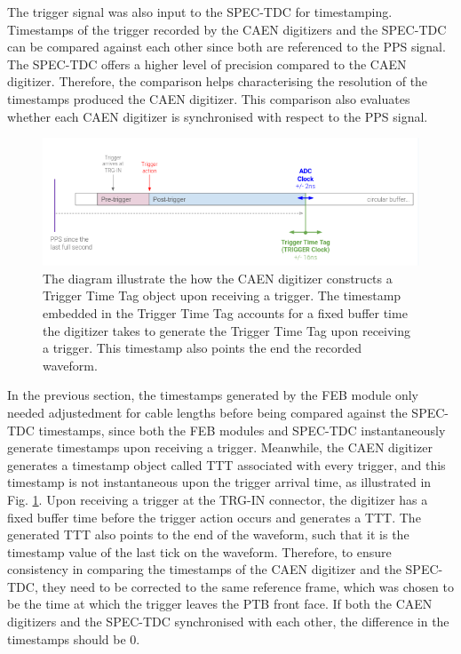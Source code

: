 The trigger signal was also input to the SPEC-TDC for timestamping.
Timestamps of the trigger recorded by the CAEN digitizers and the SPEC-TDC can be compared against each other since both are referenced to the PPS signal.
The SPEC-TDC offers a higher level of precision compared to the CAEN digitizer.
Therefore, the comparison helps characterising the resolution of the timestamps produced the CAEN digitizer. 
This comparison also evaluates whether each CAEN digitizer is synchronised with respect to the PPS signal.

\begin{figure}[htbp!] 
\centering    
\includegraphics[width=1.0\textwidth]{TTT_diagram}
\caption[TTTDiagram]{
The diagram illustrate the how the CAEN digitizer constructs a Trigger Time Tag object upon receiving a trigger.
The timestamp embedded in the Trigger Time Tag accounts for a fixed buffer time the digitizer takes to generate the Trigger Time Tag upon receiving a trigger.
This timestamp also points the end the recorded waveform.
}
\label{fig:TTTDiagram}
\end{figure}

In the previous section, the timestamps generated by the FEB module only needed adjustedment for cable lengths before being compared against the SPEC-TDC timestamps, since both the FEB modules and SPEC-TDC instantaneously generate timestamps upon receiving a trigger.
Meanwhile, the CAEN digitizer generates a timestamp object called TTT associated with every trigger, and this timestamp is not instantaneous upon the trigger arrival time, as illustrated in Fig. \ref{fig:TTTDiagram}. 
Upon receiving a trigger at the TRG-IN connector, the digitizer has a fixed buffer time before the trigger action occurs and generates a TTT.
The generated TTT also points to the end of the waveform, such that it is the timestamp value of the last tick on the waveform.
Therefore, to ensure consistency in comparing the timestamps of the CAEN digitizer and the SPEC-TDC, they need to be corrected to the same reference frame, which was chosen to be the time at which the trigger leaves the PTB front face.
If both the CAEN digitizers and the SPEC-TDC synchronised with each other, the difference in the timestamps should be 0.

